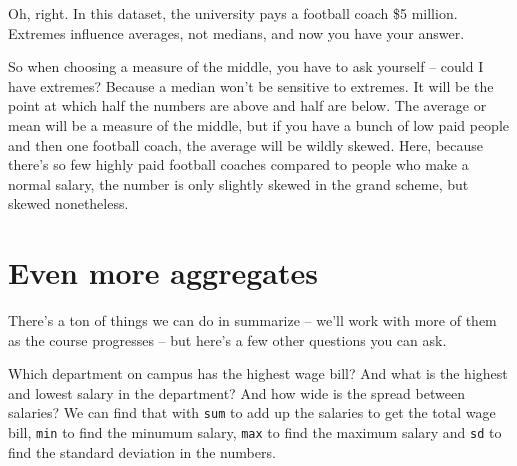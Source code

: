 \documentclass[]{book}
\newenvironment{Shaded}{\begin{snugshade}}{\end{snugshade}}
\newcommand{\DataTypeTok}[1]{\textcolor[rgb]{0.13,0.29,0.53}{#1}}
\newcommand{\KeywordTok}[1]{\textcolor[rgb]{0.13,0.29,0.53}{\textbf{#1}}}
\newcommand{\NormalTok}[1]{#1}
\newcommand{\OperatorTok}[1]{\textcolor[rgb]{0.81,0.36,0.00}{\textbf{#1}}}
\newcommand{\StringTok}[1]{\textcolor[rgb]{0.31,0.60,0.02}{#1}}
\begin{document}
Oh, right. In this dataset, the university pays a football coach \$5 million. Extremes influence averages, not medians, and now you have your answer.

So when choosing a measure of the middle, you have to ask yourself -- could I have extremes? Because a median won't be sensitive to extremes. It will be the point at which half the numbers are above and half are below. The average or mean will be a measure of the middle, but if you have a bunch of low paid people and then one football coach, the average will be wildly skewed. Here, because there's so few highly paid football coaches compared to people who make a normal salary, the number is only slightly skewed in the grand scheme, but skewed nonetheless.

\hypertarget{even-more-aggregates}{%
\section{Even more aggregates}\label{even-more-aggregates}}

There's a ton of things we can do in summarize -- we'll work with more of them as the course progresses -- but here's a few other questions you can ask.

Which department on campus has the highest wage bill? And what is the highest and lowest salary in the department? And how wide is the spread between salaries? We can find that with \texttt{sum} to add up the salaries to get the total wage bill, \texttt{min} to find the minumum salary, \texttt{max} to find the maximum salary and \texttt{sd} to find the standard deviation in the numbers.

\begin{Shaded}
\end{Shaded}
\end{document}
